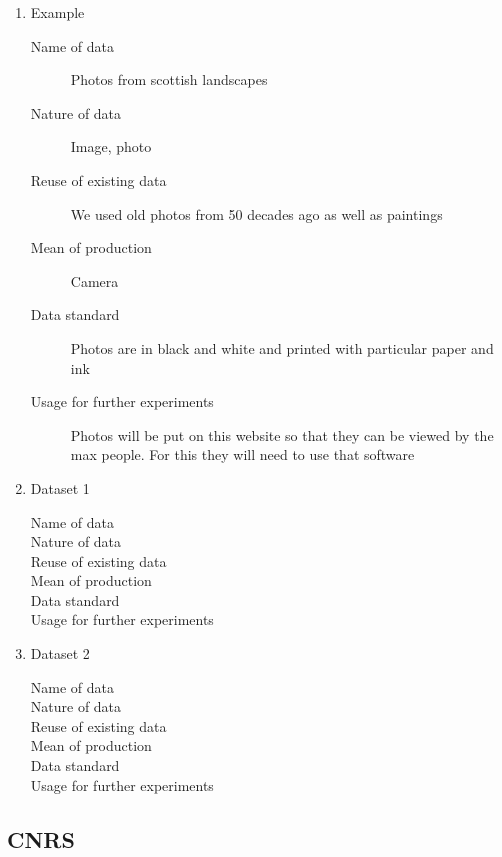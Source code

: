 \documentclass[12pt]{amsbook}
\begin{document}
\begin{enumerate}


\item{Example}


\begin{description}
\item[Name of data] Photos from scottish landscapes
\item[Nature of data] Image, photo
\item[Reuse of existing data] We used old photos from 50 decades ago as well as paintings
\item[Mean of production] Camera
\item[Data standard] Photos are in black and white and printed with particular paper and ink
\item [Usage for further experiments] Photos will be put on this website so that they can be viewed by the max people. For this they will need to use that software
\end{description}


\item {Dataset 1} 


\begin{description}
\item[Name of data] 
\item[Nature of data] 
\item[Reuse of existing data] 
\item[Mean of production]
\item[Data standard]
\item [Usage for further experiments] 
\end{description}


\item{Dataset 2}


\begin{description}
\item[Name of data] 
\item[Nature of data]
\item[Reuse of existing data]
\item[Mean of production] 
\item[Data standard]
\item [Usage for further experiments] 
\end{description}

\end{enumerate}

\subsection{CNRS}
\end{document}
